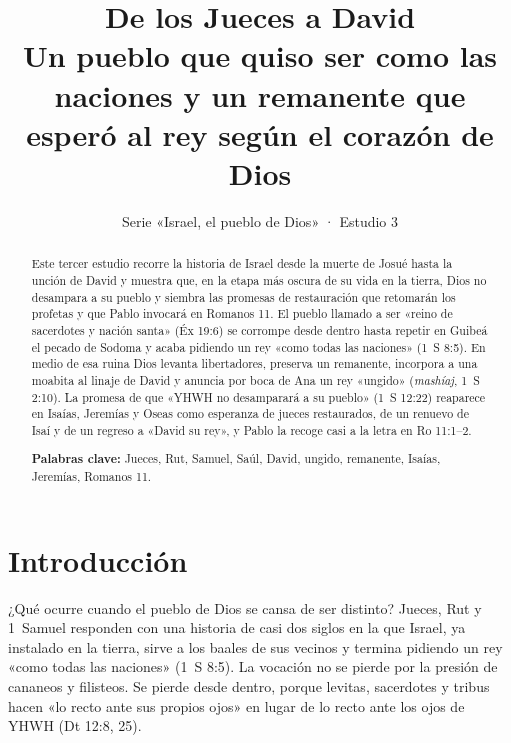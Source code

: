 \title{\color{ladrillo}\bfseries De los Jueces a David\\[4pt]\large\color{cafe}\mdseries Un pueblo que quiso ser como las naciones y un remanente que esperó al rey según el corazón de Dios}
\author{}\date{\color{sepia}Serie «Israel, el pueblo de Dios» · Estudio 3}

\maketitle\thispagestyle{empty}

\begin{abstract}\noindent
Este tercer estudio recorre la historia de Israel desde la muerte de Josué hasta la unción de David y muestra que, en la etapa más oscura de su vida en la tierra, Dios no desampara a su pueblo y siembra las promesas de restauración que retomarán los profetas y que Pablo invocará en Romanos 11. El pueblo llamado a ser «reino de sacerdotes y nación santa» (Éx 19:6) se corrompe desde dentro hasta repetir en Guibeá el pecado de Sodoma y acaba pidiendo un rey «como todas las naciones» (1~S 8:5). En medio de esa ruina Dios levanta libertadores, preserva un remanente, incorpora a una moabita al linaje de David y anuncia por boca de Ana un rey «ungido» (\emph{mashíaj}, 1~S 2:10). La promesa de que «YHWH no desamparará a su pueblo» (1~S 12:22) reaparece en Isaías, Jeremías y Oseas como esperanza de jueces restaurados, de un renuevo de Isaí y de un regreso a «David su rey», y Pablo la recoge casi a la letra en Ro 11:1--2.
\par\smallskip\noindent\textbf{Palabras clave:} Jueces, Rut, Samuel, Saúl, David, ungido, remanente, Isaías, Jeremías, Romanos 11.
\end{abstract}

\section{Introducción}

¿Qué ocurre cuando el pueblo de Dios se cansa de ser distinto? Jueces, Rut y 1~Samuel responden con una historia de casi dos siglos en la que Israel, ya instalado en la tierra, sirve a los baales de sus vecinos y termina pidiendo un rey «como todas las naciones» (1~S 8:5). La vocación no se pierde por la presión de cananeos y filisteos. Se pierde desde dentro, porque levitas, sacerdotes y tribus hacen «lo recto ante sus propios ojos» en lugar de lo recto ante los ojos de YHWH (Dt 12:8, 25).


